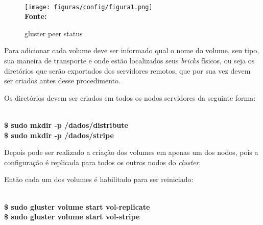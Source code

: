{ \\

\begin{figure}[!htp]
\centering
\caption{gluster peer status}
\vspace{-0.3cm}
\texttt{[image: figuras/config/figura1.png]}
\footnotesize\\ \textbf{Fonte: }
\label{fig:peer}
\end{figure}

Para adicionar cada volume deve ser informado qual o nome do volume, seu tipo, sua maneira 
de transporte e onde estão localizados seus \textit{bricks} físicos, ou seja os diretórios 
que serão exportados dos servidores remotos, que por sua vez devem ser criados antes desse 
procedimento.

Os diretórios devem ser criados em todos os nodos servidores da seguinte forma:

 \\
\textbf{\$  sudo mkdir -p /dados/distribute} \\
\textbf{\$ sudo mkdir -p /dados/stripe}

Depois pode ser realizado a criação dos volumes em apenas um dos nodos, pois a configuração é 
replicada para todos os outros nodos do \textit{cluster}.




Então cada um dos volumes é habilitado para ser reiniciado:

 \\
\textbf{\$  sudo gluster volume start vol-replicate }\\
\textbf{\$  sudo gluster volume start vol-stripe}

}

